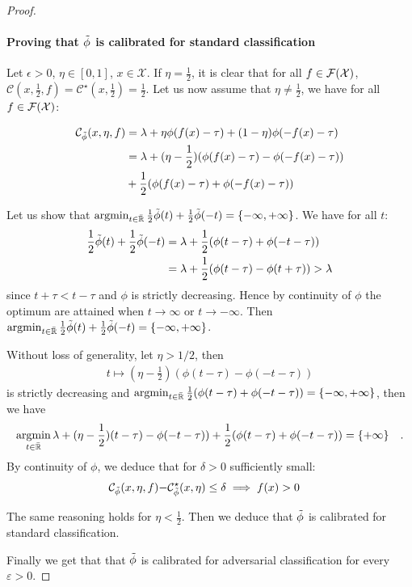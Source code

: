\begin{proof}
    \paragraph{Proving that $\Tilde{\phi}$ is calibrated for standard classification} Let $\epsilon>0$, $\eta\in[0,1]$, $x\in\mathcal{X}$. If $\eta=\frac12$, it is clear that for all $f\in\mathcal{F}(\mathcal{X})$, $\mathcal{C}(x,\frac12,f)= \mathcal{C}^\star(x,\frac12)=\frac12$. Let us now assume that $\eta\neq\frac12$, we have for all $f\in\mathcal{F}(\mathcal{X})$:
    
    \begin{align*}
         \mathcal{C}_{\Tilde{\phi}}(x,\eta,f) &= \lambda + \eta\phi(f(x)-\tau) + (1-\eta)\phi(-f(x)-\tau)\\
         &= \lambda + (\eta-\frac12)\left(\phi(f(x)-\tau)-\phi(-f(x)-\tau)\right)\\
         &+\frac12 \left(\phi(f(x)-\tau)+\phi(-f(x)-\tau)\right)
    \end{align*}
    
    
    Let us  show that $\operatorname*{argmin}_{t\in\bar{\mathbb{R}}}\frac12\Tilde{\phi}(t)+\frac12 \Tilde{\phi}(-t) = \{-\infty,+\infty\}$. We have for all $t$:
    \begin{align*}
        \frac12\Tilde{\phi}(t)+\frac12\Tilde{\phi}(-t) &= \lambda +\frac12 \left(\phi(t-\tau)+\phi(-t-\tau)\right)\\
        & = \lambda +\frac12 \left(\phi(t-\tau)-\phi(t+\tau)\right)>\lambda
    \end{align*}
    since $t+\tau< t-\tau$ and $\phi$ is strictly decreasing. Hence by continuity of $\phi$ the optimum are attained when $t\to\infty$ or $t\to-\infty$. Then $\operatorname*{argmin}_{t\in\bar{\mathbb{R}}}\frac12\Tilde{\phi}(t)+\frac12 \Tilde{\phi}(-t) = \{-\infty,+\infty\}$.
    
    Without loss of generality, let $\eta>1/2$, then
    \begin{align*}
        t\mapsto  (\eta-\frac12)\left(\phi(t-\tau)-\phi(-t-\tau)\right)
    \end{align*}
    is strictly decreasing and 
        $\argminB_{t\in\bar{\RR}}\frac12 \left(\phi(t-\tau)+\phi(-t-\tau)\right) = \{-\infty,+\infty\}$, then we have 
    \begin{align*}
        \argminB_{t\in\bar{\RR}} \lambda + (\eta-\frac12)\left(t-\tau)-\phi(-t-\tau)\right)+\frac12 \left(\phi(t-\tau)+\phi(-t-\tau)\right) = \{+\infty\}\quad.
    \end{align*}
     By continuity of $\phi$, we deduce that for $\delta>0$ sufficiently small:
    \begin{align*}
        \mathcal{C}_{\Tilde{\phi}}(x,\eta,f)-&\mathcal{C}^\star_{\Tilde{\phi}}(x,\eta)\leq\delta\implies f(x)>0
    \end{align*}
    
    The same reasoning holds for $\eta<\frac12$. Then we deduce that $\Tilde{\phi}$ is calibrated for standard classification.
    
    \medskip
    
    Finally we get that  that $\Tilde{\phi}$ is calibrated for adversarial classification for every $\varepsilon>0$.
\end{proof}
